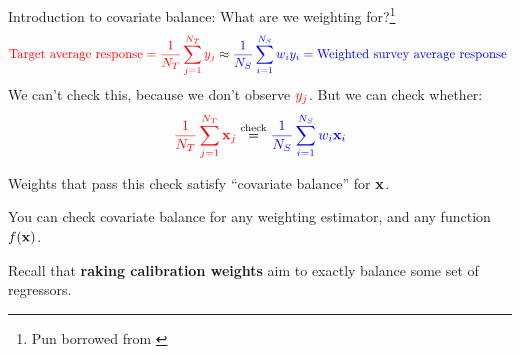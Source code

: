 

\begin{frame}[t]{Introduction to covariate balance: What are we weighting for?\footnote{Pun borrowed from \textcite{solon:2015:weightingfor}}}
$$
\textcolor{red}{\textrm{Target average response} =
\frac{1}{{\textcolor{red}{N_T}}} \sum_{j=1}^{\textcolor{red}{N_T}} y_j} \approx \textcolor{blue}{\frac{1}{{\textcolor{blue}{N_S}}} \sum_{i=1}^{\textcolor{blue}{N_S}} w_i y_i
= \textrm{Weighted survey average response }}
$$
We can't check this, because we don't observe $\textcolor{red}{y_j}$.  \pause But we can check whether:
$$
    \textcolor{red}{\frac{1}{{\textcolor{red}{N_T}}} \sum_{j=1}^{\textcolor{red}{N_T}} \mathbf{x}_j} \overset{\textrm{check}}{=} \textcolor{blue}{\frac{1}{{\textcolor{blue}{N_S}}} \sum_{i=1}^{\textcolor{blue}{N_S}} w_i \mathbf{x}_i}
$$

Weights that pass this check satisfy ``covariate balance'' for $\mathbf{x}$.

\pause

\vspace{1em}

You can check covariate balance for any weighting estimator,
and any function $f(\mathbf{x})$.

Recall that \textbf{raking calibration weights} aim to exactly balance some set of regressors.


%



\end{frame}






